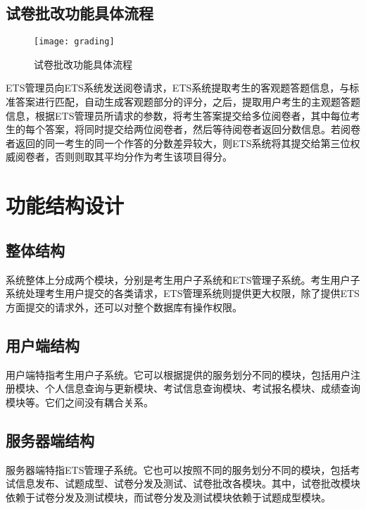\subsection{试卷批改功能具体流程}
\begin{figure}[ht]
\centering
\texttt{[image: grading]}
\caption{试卷批改功能具体流程} \label{fig:figure1}
\end{figure}

ETS管理员向ETS系统发送阅卷请求，ETS系统提取考生的客观题答题信息，与标准答案进行匹配，自动生成客观题部分的评分，之后，提取用户考生的主观题答题信息，根据ETS管理员所请求的参数，将考生答案提交给多位阅卷者，其中每位考生的每个答案，将同时提交给两位阅卷者，然后等待阅卷者返回分数信息。若阅卷者返回的同一考生的同一个作答的分数差异较大，则ETS系统将其提交给第三位权威阅卷者，否则则取其平均分作为考生该项目得分。


\section{功能结构设计}
\subsection{整体结构}
系统整体上分成两个模块，分别是考生用户子系统和ETS管理子系统。考生用户子系统处理考生用户提交的各类请求，ETS管理系统则提供更大权限，除了提供ETS方面提交的请求外，还可以对整个数据库有操作权限。

\subsection{用户端结构}
用户端特指考生用户子系统。它可以根据提供的服务划分不同的模块，包括用户注册模块、个人信息查询与更新模块、考试信息查询模块、考试报名模块、成绩查询模块等。它们之间没有耦合关系。

\subsection{服务器端结构}
服务器端特指ETS管理子系统。它也可以按照不同的服务划分不同的模块，包括考试信息发布、试题成型、试卷分发及测试、试卷批改各模块。其中，试卷批改模块依赖于试卷分发及测试模块，而试卷分发及测试模块依赖于试题成型模块。



